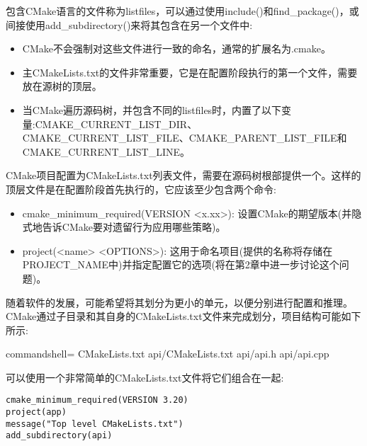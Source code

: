 
包含CMake语言的文件称为listfiles，可以通过使用include()和find\_package()，或间接使用add\_subdirectory()来将其包含在另一个文件中:

\begin{itemize}
\item 
CMake不会强制对这些文件进行一致的命名，通常的扩展名为.cmake。

\item 
主CMakeLists.txt的文件非常重要，它是在配置阶段执行的第一个文件，需要放在源树的顶层。

\item 
当CMake遍历源码树，并包含不同的listfiles时，内置了以下变量:CMAKE\_CURRENT\_LIST\_DIR、CMAKE\_CURRENT\_LIST\_FILE、CMAKE\_PARENT\_LIST\_FILE和CMAKE\_CURRENT\_LIST\_LINE。
\end{itemize}


CMake项目配置为CMakeLists.txt列表文件，需要在源码树根部提供一个。这样的顶层文件是在配置阶段首先执行的，它应该至少包含两个命令:

\begin{itemize}
\item 
cmake\_minimum\_required(VERSION <x.xx>): 设置CMake的期望版本(并隐式地告诉CMake要对遗留行为应用哪些策略)。

\item 
project(<name> <OPTIONS>): 这用于命名项目(提供的名称将存储在PROJECT\_NAME中)并指定配置它的选项(将在第2章中进一步讨论这个问题)。
\end{itemize}

随着软件的发展，可能希望将其划分为更小的单元，以便分别进行配置和推理。CMake通过子目录和其自身的CMakeLists.txt文件来完成划分，项目结构可能如下所示:

\begin{tcblisting}{commandshell={}}
CMakeLists.txt
api/CMakeLists.txt
api/api.h
api/api.cpp
\end{tcblisting}

可以使用一个非常简单的CMakeLists.txt文件将它们组合在一起:

\begin{lstlisting}[style=styleCMake]
cmake_minimum_required(VERSION 3.20)
project(app)
message("Top level CMakeLists.txt")
add_subdirectory(api)
\end{lstlisting}

